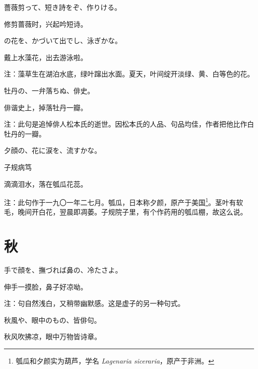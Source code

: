 \begin{haiku}
    {\FH 薔薇剪って、短き詩をぞ、作りける。}

    {\FK 修剪蔷薇时，兴起吟短诗。}
\end{haiku}

\begin{haiku}
    {\FH {}の花を、かづいて出でし、泳ぎかな。}

    {\FK 戴上水藻花，出去游泳啦。}

    {\FT 注：藻草生在湖泊水底，绿叶蹿出水面。夏天，叶间绽开淡绿、黄、白等色的花。}
\end{haiku}

\begin{haiku}
    {\FH 牡丹の、一弁落ちぬ、俳史。}

    {\FK 俳谐史上，掉落牡丹一瓣。}

    {\FT 注：此句是追悼俳人松本氏的逝世。因松本氏的人品、句品均佳，作者把他比作白牡丹的一瓣。}
\end{haiku}

\begin{haiku}
    {\FH 夕顔の、花に涙を、流すかな。}

    {\FK 子规病笃}

    {\FK 滴滴泪水，落在瓠瓜花蕊。}

    {\FT 注：此句作于一九〇一年二七月。瓠瓜，日本称夕颜，原产于美国\footnote{{\FT 瓠瓜和夕颜实为葫芦，学名} \textit{Lagenaria siceraria}{\FT ，原产于非洲。}}。茎叶有软毛，晚间开白花，翌晨即凋萎。子规院子里，有个作药用的瓠瓜棚，故这么说。}
\end{haiku}

\section{\FK 秋}

\setcounter{haikucounter}{0}

\begin{haiku}
    {\FH 手で顔を、撫づれば鼻の、冷たさよ。}

    {\FK 伸手一摸脸，鼻子好凉呦。}

    {\FT 注：句自然浅白，又稍带幽默感。这是虚子的另一种句式。}
\end{haiku}

\begin{haiku}
    {\FH 秋風や、眼中のもの、皆俳句。}

    {\FK 秋风吹拂凉，眼中万物皆诗章。}
\end{haiku}

